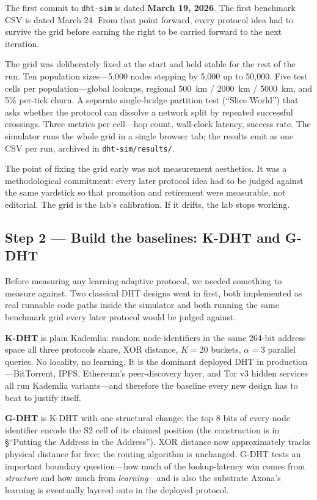 \documentclass[nobib]{tufte-handout}
\begin{document}
The first commit to \texttt{dht-sim} is dated \textbf{March 19, 2026}. The first benchmark CSV is dated March 24. From that point forward, every protocol idea had to survive the grid before earning the right to be carried forward to the next iteration.

The grid was deliberately fixed at the start and held stable for the rest of the run. Ten population sizes---5{,}000 nodes stepping by 5{,}000 up to 50{,}000. Five test cells per population---global lookups, regional 500~km / 2000~km / 5000~km, and 5\% per-tick churn. A separate single-bridge partition test (``Slice World'') that asks whether the protocol can dissolve a network split by repeated successful crossings. Three metrics per cell---hop count, wall-clock latency, success rate. The simulator runs the whole grid in a single browser tab; the results emit as one CSV per run, archived in \texttt{dht-sim/results/}.

The point of fixing the grid early was not measurement aesthetics. It was a methodological commitment: every later protocol idea had to be judged against the same yardstick so that promotion and retirement were measurable, not editorial. The grid is the lab's calibration. If it drifts, the lab stops working.

\subsection*{Step 2 --- Build the baselines: K-DHT and G-DHT}

Before measuring any learning-adaptive protocol, we needed something to measure against. Two classical DHT designs went in first, both implemented as real runnable code paths inside the simulator and both running the same benchmark grid every later protocol would be judged against.

\textbf{K-DHT} is plain Kademlia: random node identifiers in the same 264-bit address space all three protocols share, XOR distance, $K=20$ buckets, $\alpha=3$ parallel queries.  No locality, no learning.  It is the dominant deployed DHT in production---BitTorrent, IPFS, Ethereum's peer-discovery layer, and Tor v3 hidden services all run Kademlia variants---and therefore the baseline every new design has to beat to justify itself.

\textbf{G-DHT} is K-DHT with one structural change: the top 8 bits of every node identifier encode the S2 cell of its claimed position (the construction is in \S``Putting the Address in the Address'').  XOR distance now approximately tracks physical distance for free; the routing algorithm is unchanged.  G-DHT tests an important boundary question---how much of the lookup-latency win comes from \emph{structure} and how much from \emph{learning}---and is also the substrate Axona's learning is eventually layered onto in the deployed protocol.
\end{document}
